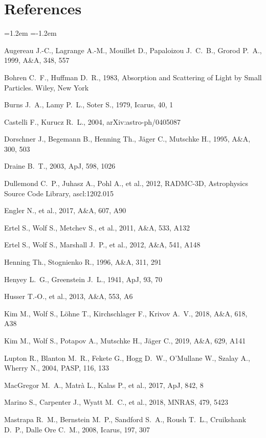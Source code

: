 \documentclass[11pt,a4paper]{article}
\begin{document}
\section*{References}
\small
\begin{list}{}{\leftmargin=1.2em \itemindent=-1.2em \itemsep=1pt}
\item Augereau J.-C., Lagrange A.-M., Mouillet D., Papaloizou J.~C.~B., Grorod P.~A., 1999, A\&A, 348, 557
\item Bohren C.~F., Huffman D.~R., 1983, Absorption and Scattering of Light by Small Particles. Wiley, New York
\item Burns J.~A., Lamy P.~L., Soter S., 1979, Icarus, 40, 1
\item Castelli F., Kurucz R.~L., 2004, arXiv:astro-ph/0405087
\item Dorschner J., Begemann B., Henning Th., J\"ager C., Mutschke H., 1995, A\&A, 300, 503
\item Draine B.~T., 2003, ApJ, 598, 1026
\item Dullemond C.~P., Juhasz A., Pohl A., et al., 2012, RADMC-3D, Astrophysics Source Code Library, ascl:1202.015
\item Engler N., et al., 2017, A\&A, 607, A90
\item Ertel S., Wolf S., Metchev S., et al., 2011, A\&A, 533, A132
\item Ertel S., Wolf S., Marshall J.~P., et al., 2012, A\&A, 541, A148
\item Henning Th., Stognienko R., 1996, A\&A, 311, 291
\item Henyey L.~G., Greenstein J.~L., 1941, ApJ, 93, 70
\item Husser T.-O., et al., 2013, A\&A, 553, A6
\item Kim M., Wolf S., L\"ohne T., Kirchschlager F., Krivov A.~V., 2018, A\&A, 618, A38
\item Kim M., Wolf S., Potapov A., Mutschke H., J\"ager C., 2019, A\&A, 629, A141
\item Lupton R., Blanton M.~R., Fekete G., Hogg D.~W., O'Mullane W., Szalay A., Wherry N., 2004, PASP, 116, 133
\item MacGregor M.~A., Matr\`a L., Kalas P., et al., 2017, ApJ, 842, 8
\item Marino S., Carpenter J., Wyatt M.~C., et al., 2018, MNRAS, 479, 5423
\item Mastrapa R.~M., Bernstein M.~P., Sandford S.~A., Roush T.~L., Cruikshank D.~P., Dalle Ore C.~M., 2008, Icarus, 197, 307

\end{list}
\end{document}

